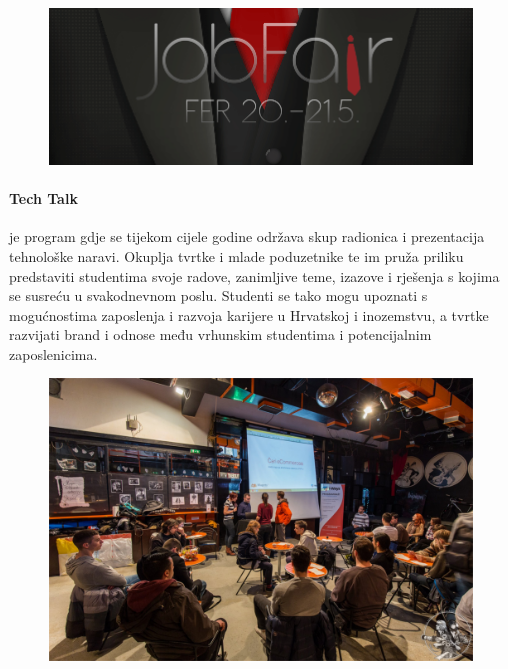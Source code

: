 \documentclass[12pt,a4paper,oneside]{article}
\begin{document}
	\begin{figure}[h!]
		\centering
		\vspace{5mm}
		\includegraphics[scale=0.35]{jobfair.png}	
	\end{figure}	
	
	\paragraph{Tech Talk}je program gdje se tijekom cijele godine održava skup radionica i prezentacija tehnološke naravi. Okuplja tvrtke i mlade poduzetnike te im pruža priliku predstaviti studentima svoje radove, zanimljive teme, izazove i rješenja s kojima se susreću u svakodnevnom poslu. Studenti se tako mogu upoznati s mogućnostima zaposlenja i razvoja karijere u Hrvatskoj i inozemstvu, a tvrtke razvijati brand i odnose među vrhunskim studentima i potencijalnim zaposlenicima.
	
	\begin{figure}[h!]
		\centering
		\vspace{5mm}
		\includegraphics[scale=0.25]{techtalk.jpg}	
	\end{figure}	
	
\end{document}
